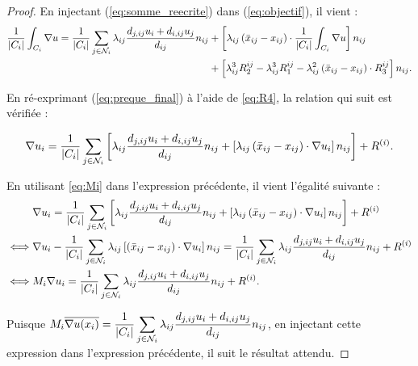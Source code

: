 \documentclass[12pt,a4paper]{article}
\begin{document}
	\begin{proof}
		En injectant (\ref{eq:somme_reecrite}) dans (\ref{eq:objectif}), il vient :
		\begin{equation}\label{eq:preque_final}
			\begin{aligned}
				\dfrac1{\left\lvert C_i \right\rvert}\displaystyle\int_{C_i}  {\nabla u} = \dfrac1{\left\lvert C_i \right\rvert}\sum_{j \in \mathcal N_i} \lambda_{ij}\dfrac{d_{j,ij}u_i + d_{i,ij}u_j}{d_{ij}} {n_{ij}} &+ \left[\lambda_{ij}\left( {\bar x_{ij}-x_{ij}}\right)\cdot\dfrac1{\left\lvert C_i \right\rvert}\displaystyle\int_{C_i}  {\nabla u}\right]  {n_{ij}}\\
				& + \left[\lambda_{ij}^3R_2^{ij} - \lambda_{ij}^3R_1^{ij} - \lambda_{ij}^2\left( {\bar x_{ij}-x_{ij}}\right)\cdot R_3^{ij}\right]n_{ij}.
			\end{aligned}
		\end{equation}
		
		
		En ré-exprimant (\ref{eq:preque_final}) à l'aide de \eqref{eq:R4}, la relation qui suit est vérifiée : 
		
		\begin{equation}\label{eq:final}
			 \nabla u_i = \dfrac1{\left\lvert C_i \right\rvert}\displaystyle\sum_{j \in \mathcal N_i} \left[\lambda_{ij}\dfrac{d_{j,ij}u_i + d_{i,ij}u_j}{d_{ij}} {n_{ij}} + \left[\lambda_{ij}\left( {\bar x_{ij}-x_{ij}}\right)\cdot \nabla u_i\right]  {n_{ij}}\right] +  {R^{(i)}}.
		\end{equation}
		
		En utilisant \eqref{eq:Mi} dans l'expression précédente, il vient l'égalité suivante :
		\[
			\begin{aligned}
				&\nabla u_i = \dfrac1{\left\lvert C_i \right\rvert}\displaystyle\sum_{j \in \mathcal N_i} \left[\lambda_{ij}\dfrac{d_{j,ij}u_i + d_{i,ij}u_j}{d_{ij}} {n_{ij}} + \left[\lambda_{ij}\left( {\bar x_{ij}-x_{ij}}\right)\cdot \nabla u_i\right]  {n_{ij}}\right] +  {R^{(i)}}\\
				\iff& \nabla u_i - \dfrac1{\left\lvert C_i \right\rvert}\displaystyle\sum_{j\in\mathcal N_i} \lambda_{ij}\left[(\bar x_{ij}-x_{ij})\cdot\nabla u_i\right] n_{ij} = \dfrac1{\left\lvert C_i \right\rvert}\displaystyle\sum_{j \in \mathcal N_i} \lambda_{ij}\dfrac{d_{j,ij}u_i + d_{i,ij}u_j}{d_{ij}} n_{ij}+ R^{(i)}\\
				\iff & M_i \nabla u_i = \dfrac1{\left\lvert C_i \right\rvert}\displaystyle\sum_{j \in \mathcal N_i} \lambda_{ij}\dfrac{d_{j,ij}u_i + d_{i,ij}u_j}{d_{ij}} n_{ij} + R^{(i)}.
			\end{aligned}
		\]
		
		Puisque $M_i  {\overline{\nabla u(x_i)}} = \dfrac1{\left\lvert C_i \right\rvert}\displaystyle\sum_{j \in \mathcal N_i} \lambda_{ij}\dfrac{d_{j,ij}u_i + d_{i,ij}u_j}{d_{ij}} {n_{ij}}$, en injectant cette expression dans l'expression précédente, il suit le résultat attendu.
	\end{proof}
	
\end{document}
